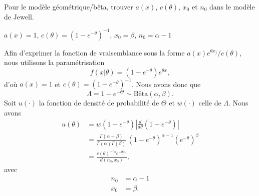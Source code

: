 \begin{exercice}
  Pour le modèle géométrique/bêta, trouver $a(x)$, $c(\theta)$,
  $x_0$ et $n_0$ dans le modèle de Jewell.
  \begin{rep}
    $a(x) = 1$,
    $c(\theta) = (1 - e^{-\theta})^{-1}$,
    $x_0 = \beta$,
    $n_0 = \alpha - 1$
  \end{rep}
  \begin{sol}
    Afin d'exprimer la fonction de vraisemblance sous la forme
    $a(x) e^{\theta x_j}/c(\theta)$, nous utilisons la paramétrisation
    \begin{equation*}
      f(x|\theta) = (1 - e^{-\theta}) e^{\theta x},
    \end{equation*}
    d'où $a(x) = 1$ et $c(\theta) = (1 - e^{-\theta})^{-1}$. Nous avons donc que
    \begin{equation*}
      \Lambda = 1 - e^{-\Theta} \sim \text{Bêta}(\alpha, \beta).
    \end{equation*}
    Soit $u(\cdot)$ la fonction de densité de probabilité de $\Theta$
    et $w(\cdot)$ celle de $\Lambda$. Nous avons
    \begin{align*}
      u(\theta)
      &= w(1 - e^{-\theta}) \left|\frac{d}{d\theta} (1 - e^{-\theta}) \right| \\
      &=\frac{\Gamma(\alpha + \beta)}{\Gamma(\alpha) \Gamma(\beta)}\,
      (1 - e^{-\theta})^{\alpha-1}(e^{-\theta})^\beta \\
      &=\frac{c(\theta)^{-n_0} e^{-\theta x_0}}{d(n_0, x_0)},
    \end{align*}
    avec
    \begin{align*}
      n_0 &= \alpha - 1 \\
      x_0 &= \beta.
    \end{align*}
  \end{sol}
\end{exercice}

